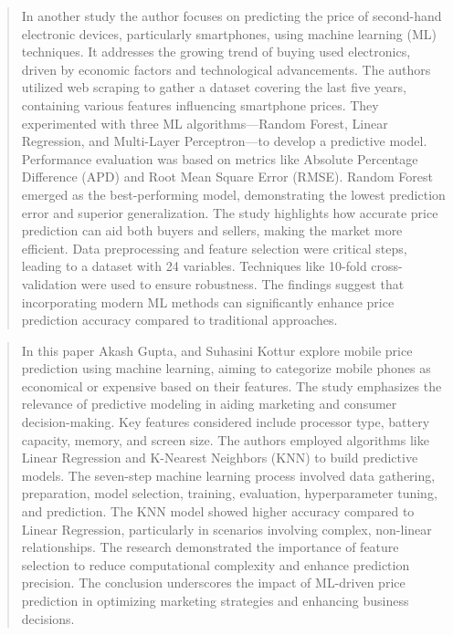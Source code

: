 \documentclass[12pt]{report}
\begin{document}
\begin{quotation}
  In another study \cite{abbasi2024} the author focuses on predicting the price of second-hand electronic devices, particularly smartphones, using machine learning (ML) techniques. It addresses the growing trend of buying used electronics, driven by economic factors and technological advancements. The authors utilized web scraping to gather a dataset covering the last five years, containing various features influencing smartphone prices. They experimented with three ML algorithms—Random Forest, Linear Regression, and Multi-Layer Perceptron—to develop a predictive model. Performance evaluation was based on metrics like Absolute Percentage Difference (APD) and Root Mean Square Error (RMSE). Random Forest emerged as the best-performing model, demonstrating the lowest prediction error and superior generalization. The study highlights how accurate price prediction can aid both buyers and sellers, making the market more efficient. Data preprocessing and feature selection were critical steps, leading to a dataset with 24 variables. Techniques like 10-fold cross-validation were used to ensure robustness. The findings suggest that incorporating modern ML methods can significantly enhance price prediction accuracy compared to traditional approaches.
\end{quotation}

\begin{quotation}
  In this paper  Akash Gupta, and Suhasini Kottur \cite{gupta2020} explore mobile price prediction using machine learning, aiming to categorize mobile phones as economical or expensive based on their features. The study emphasizes the relevance of predictive modeling in aiding marketing and consumer decision-making. Key features considered include processor type, battery capacity, memory, and screen size. The authors employed algorithms like Linear Regression and K-Nearest Neighbors (KNN) to build predictive models. The seven-step machine learning process involved data gathering, preparation, model selection, training, evaluation, hyperparameter tuning, and prediction. The KNN model showed higher accuracy compared to Linear Regression, particularly in scenarios involving complex, non-linear relationships. The research demonstrated the importance of feature selection to reduce computational complexity and enhance prediction precision. The conclusion underscores the impact of ML-driven price prediction in optimizing marketing strategies and enhancing business decisions.
\end{quotation}
\end{document}
